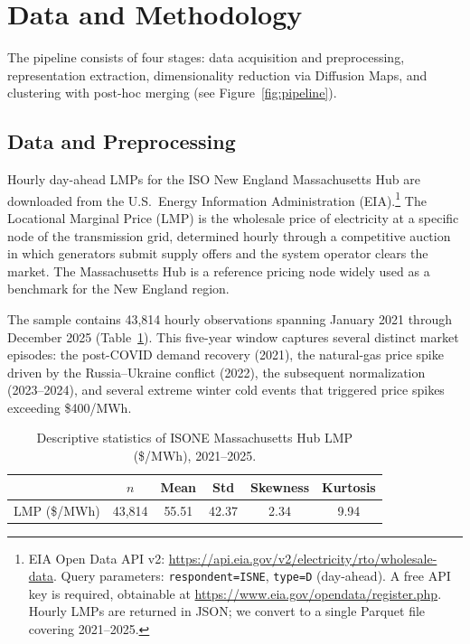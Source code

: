 \documentclass[12pt]{article}
\begin{document}
\section{Data and Methodology}
\label{sec:methodology}

The pipeline consists of four stages: data acquisition and preprocessing, representation extraction, dimensionality reduction via Diffusion Maps, and clustering with post-hoc merging (see Figure~\ref{fig:pipeline}).

\subsection{Data and Preprocessing}
\label{sec:preprocessing}

Hourly day-ahead LMPs for the ISO New England Massachusetts Hub are downloaded from the U.S.\ Energy Information Administration (EIA).\footnote{EIA Open Data API v2: \url{https://api.eia.gov/v2/electricity/rto/wholesale-data}. Query parameters: \texttt{respondent=ISNE}, \texttt{type=D} (day-ahead). A free API key is required, obtainable at \url{https://www.eia.gov/opendata/register.php}. Hourly LMPs are returned in JSON; we convert to a single Parquet file covering 2021--2025.}
The Locational Marginal Price (LMP) is the wholesale price of electricity at a specific node of the transmission grid, determined hourly through a competitive auction in which generators submit supply offers and the system operator clears the market.
The Massachusetts Hub is a reference pricing node widely used as a benchmark for the New England region.

The sample contains 43,814 hourly observations spanning January 2021 through December 2025 (Table~\ref{tab:lmp_stats}).
This five-year window captures several distinct market episodes: the post-COVID demand recovery (2021), the natural-gas price spike driven by the Russia--Ukraine conflict (2022), the subsequent normalization (2023--2024), and several extreme winter cold events that triggered price spikes exceeding \$400/MWh.

\begin{table}[H]
\centering
\caption{Descriptive statistics of ISONE Massachusetts Hub LMP (\$/MWh), 2021--2025.}
\label{tab:lmp_stats}
\begin{tabular}{lccccc}
\toprule
& $n$ & Mean & Std & Skewness & Kurtosis \\
\midrule
LMP (\$/MWh) & 43,814 & 55.51 & 42.37 & 2.34 & 9.94 \\
\bottomrule
\end{tabular}
\end{table}
\end{document}
